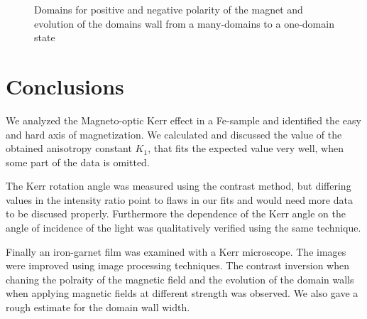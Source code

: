 \documentclass[a4paper,10pt]{scrartcl}
\begin{document}
\begin{figure}
\caption{Domains for positive  and negative  polarity of the magnet and evolution of the domains wall from a many-domains  to a one-domain  state}
\end{figure}

\section{Conclusions}

We analyzed the Magneto-optic Kerr effect in a Fe-sample and identified the easy and hard axis of magnetization. We calculated and discussed the value of the obtained anisotropy constant $K_1$, that fits the expected value very well, when some part of the data is omitted.

The Kerr rotation angle was measured using the contrast method, but differing values in the intensity ratio point to flaws in our fits and would need more data to be discused properly. Furthermore the dependence of the Kerr angle on the angle of incidence of the light was qualitatively verified using the same technique.

Finally an iron-garnet film was examined with a Kerr microscope. The images were improved using image processing techniques. The contrast inversion when chaning the polraity of the magnetic field and the evolution of the domain walls when applying magnetic fields at different strength was observed. We also gave a rough estimate for the domain wall width.

\nocite{skript}
\nocite{griffiths}
\nocite{kittel}
\nocite{meyer}
\nocite{zak}
\nocite{blume}
\nocite{wiki}
\nocite{johannes}




\end{document}
